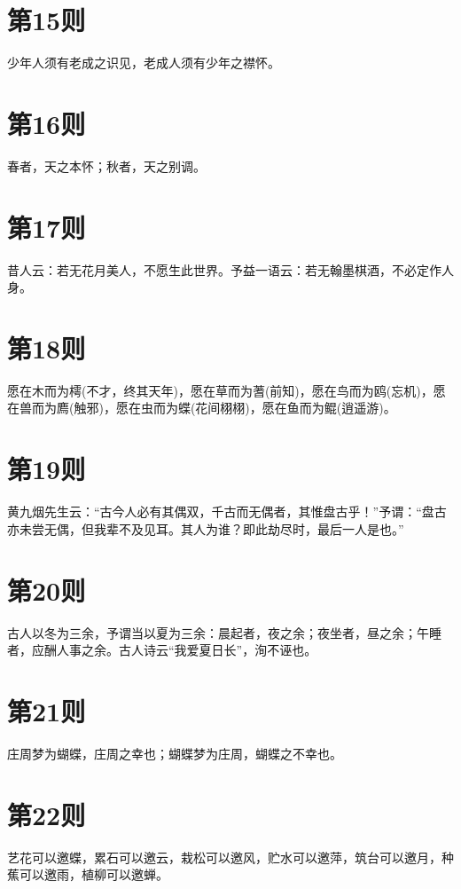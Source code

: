 \documentclass[12pt,a4paper]{ctexbook}
\begin{document}
\section{第15则}
少年人须有老成之识见，老成人须有少年之襟怀。\par

\section{第16则}
春者，天之本怀；秋者，天之别调。\par

\section{第17则}
昔人云：若无花月美人，不愿生此世界。予益一语云：若无翰墨棋酒，不必定作人身。\par

\section{第18则}
愿在木而为樗(不才，终其天年)，愿在草而为蓍(前知)，愿在鸟而为鸥(忘机)，愿在兽而为廌(触邪)，愿在虫而为蝶(花间栩栩)，愿在鱼而为鲲(逍遥游)。\par

\section{第19则}
黄九烟先生云：“古今人必有其偶双，千古而无偶者，其惟盘古乎！”予谓：“盘古亦未尝无偶，但我辈不及见耳。其人为谁？即此劫尽时，最后一人是也。”\par

\section{第20则}
古人以冬为三余，予谓当以夏为三余：晨起者，夜之余；夜坐者，昼之余；午睡者，应酬人事之余。古人诗云“我爱夏日长”，洵不诬也。\par

\section{第21则}
庄周梦为蝴蝶，庄周之幸也；蝴蝶梦为庄周，蝴蝶之不幸也。\par

\section{第22则}
艺花可以邀蝶，累石可以邀云，栽松可以邀风，贮水可以邀萍，筑台可以邀月，种蕉可以邀雨，植柳可以邀蝉。\par
\end{document}
